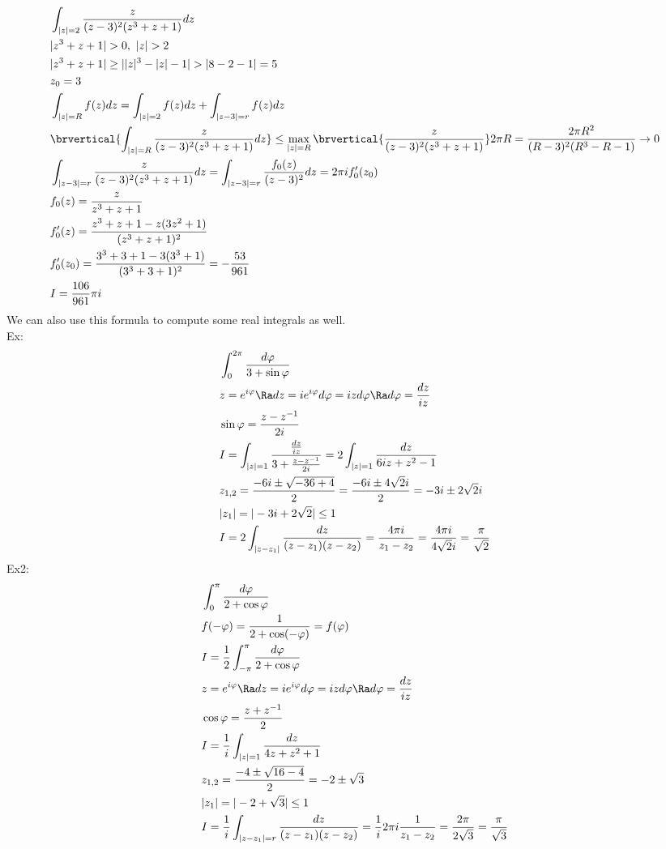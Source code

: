 \begin{align*}
    &\int_{|z|=2}\frac{z}{(z-3)^2(z^3+z+1)}dz\\
    &|z^3+z+1|>0,\ |z|>2\\
    &|z^3+z+1|\geq||z|^3-|z|-1|>|8-2-1|=5\\
    &z_0=3\\
    &\int_{|z|=R} f(z)dz=\int_{|z|=2}f(z)dz+\int_{|z-3|=r}f(z)dz\\
    &\brvertical{\int_{|z|=R}\frac{z}{(z-3)^2(z^3+z+1)}dz}\leq\max_{|z|=R}\brvertical{\frac{z}{(z-3)^2(z^3+z+1)}}2\pi R=\frac{2\pi R^2}{(R-3)^2(R^3-R-1)}\to 0\\
    &\int_{|z-3|=r}\frac{z}{(z-3)^2(z^3+z+1)}dz=\int_{|z-3|=r}\frac{f_0(z)}{(z-3)^2}dz=2\pi if_0'(z_0)\\
    &f_0(z)=\frac{z}{z^3+z+1}\\
    &f_0'(z)=\frac{z^3+z+1-z(3z^2+1)}{(z^3+z+1)^2}\\
    &f_0'(z_0)=\frac{3^3+3+1-3(3^3+1)}{(3^3+3+1)^2}=-\frac{53}{961}\\
    &I=\frac{106}{961}\pi i
\end{align*}
We can also use this formula to compute some real integrals as well.\\
Ex:
\begin{align*}
    &\int_0^{2\pi}\frac{d\varphi}{3+\sin\varphi}\\
    &z=e^{i\varphi}\Ra dz=ie^{i\varphi}d\varphi=izd\varphi\Ra d\varphi=\frac{dz}{iz}\\
    &\sin\varphi=\frac{z-z^{-1}}{2i}\\
    &I=\int_{|z|=1}\frac{\frac{dz}{iz}}{3+\frac{z-z^{-1}}{2i}}=2\int_{|z|=1}\frac{dz}{6iz+z^2-1}\\
    &z_{1,2}=\frac{-6i\pm\sqrt{-36+4}}{2}=\frac{-6i\pm4\sqrt{2}i}{2}=-3i\pm2\sqrt{2}i\\
    &|z_1|=|-3i+2\sqrt{2}|\leq1\\
    &I=2\int_{|z-z_1|}\frac{dz}{(z-z_1)(z-z_2)}=\frac{4\pi i}{z_1-z_2}=\frac{4\pi i}{4\sqrt{2}i}=\frac{\pi}{\sqrt{2}}
\end{align*}
Ex2:
\begin{align*}
    &\int_0^\pi\frac{d\varphi}{2+\cos\varphi}\\
    &f(-\varphi)=\frac{1}{2+\cos(-\varphi)}=f(\varphi)\\
    &I=\frac{1}{2}\int_{-\pi}^\pi\frac{d\varphi}{2+\cos\varphi}\\
    &z=e^{i\varphi}\Ra dz=ie^{i\varphi}d\varphi=izd\varphi\Ra d\varphi=\frac{dz}{iz}\\
    &\cos\varphi=\frac{z+z^{-1}}{2}\\
    &I=\frac{1}{i}\int_{|z|=1}\frac{dz}{4z+z^2+1}\\
    &z_{1,2}=\frac{-4\pm\sqrt{16-4}}{2}=-2\pm\sqrt{3}\\
    &|z_1|=|-2+\sqrt{3}|\leq1\\
    &I=\frac{1}{i}\int_{|z-z_1|=r}\frac{dz}{(z-z_1)(z-z_2)}=\frac{1}{i}2\pi i\frac{1}{z_1-z_2}=\frac{2\pi}{2\sqrt{3}}=\frac{\pi}{\sqrt{3}}
\end{align*}
